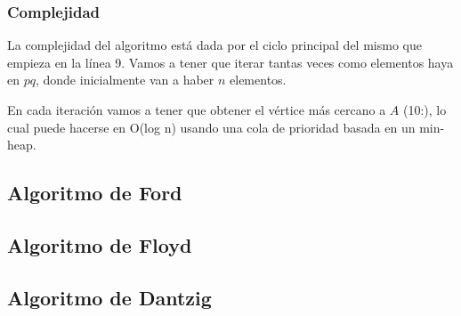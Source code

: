 \subsubsection*{Complejidad}

La complejidad del algoritmo est\'a dada por el ciclo principal del mismo que empieza en la l\'inea 9. Vamos a tener que iterar tantas veces como elementos haya en $pq$, donde inicialmente van a haber $n$ elementos.

En cada iteraci\'on vamos a tener que obtener el v\'ertice m\'as cercano a $A$ (10:), lo cual puede hacerse en O(log n) usando una cola de prioridad basada en un min-heap.


\newpage
\subsection{Algoritmo de Ford}
\newpage
\subsection{Algoritmo de Floyd}
\newpage
\subsection{Algoritmo de Dantzig}